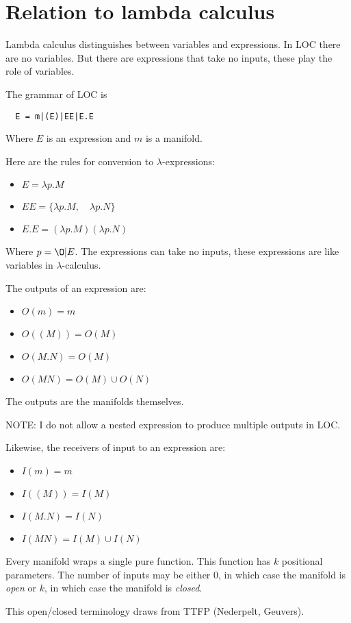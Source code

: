 \documentclass[12pt]{article}
\begin{document}
\section{Relation to lambda calculus}

Lambda calculus distinguishes between variables and expressions. In LOC there
are no variables. But there are expressions that take no inputs, these play the
role of variables.

The grammar of LOC is

\begin{verbatim}
  E = m|(E)|EE|E.E
\end{verbatim}

Where $E$ is an expression and $m$ is a manifold.

Here are the rules for conversion to $\lambda$-expressions:

\begin{itemize}
  \item $E = \lambda p . M$
  \item $EE = \{ \lambda p . M, \quad \lambda p . N \}$
  \item $E.E = ( \lambda p . M ) ( \lambda p . N )$
\end{itemize}

Where $p = \O | E$. The expressions can take no inputs, these expressions are
like variables in $\lambda$-calculus.

The outputs of an expression are:

\begin{itemize}
  \item $O(m) = m$
  \item $O( (M) ) = O(M)$
  \item $O(M.N) = O(M)$
  \item $O(MN) = O(M) \cup O(N)$
\end{itemize}

The outputs are the manifolds themselves.

NOTE: I do not allow a nested expression to produce multiple outputs in LOC.

Likewise, the receivers of input to an expression are:

\begin{itemize}
  \item $I(m) = m$
  \item $I( (M) ) = I(M)$
  \item $I(M.N) = I(N)$
  \item $I(MN) = I(M) \cup I(N)$
\end{itemize}

Every manifold wraps a single pure function. This function has $k$ positional
parameters. The number of inputs may be either 0, in which case the manifold is
\textit{open} or $k$, in which case the manifold is \textit{closed}.

This open/closed terminology draws from TTFP (Nederpelt, Geuvers).
\end{document}
